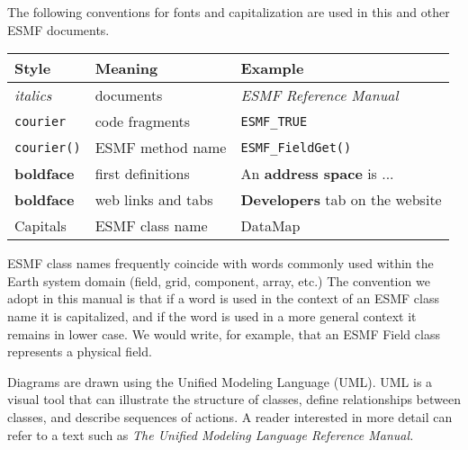 
The following conventions for fonts and capitalization are used
in this and other ESMF documents. \newline

\begin{tabular}{lll}
{\bf Style} & {\bf Meaning} & {\bf Example} \\ \hline
{\it italics}  & documents & {\it ESMF Reference Manual}\\
{\tt courier}  & code fragments & {\tt ESMF\_TRUE}\\
{\tt courier()}  & ESMF method name & {\tt ESMF\_FieldGet()} \\
{\bf boldface} & first definitions & An {\bf address space} is ...\\
{\bf boldface} & web links and tabs & {\bf Developers} tab on the website \\
{Capitals}     & ESMF class name & DataMap \\
\end{tabular} 
 
ESMF class names frequently coincide with words commonly
used within the Earth system domain (field, grid, component, array, 
etc.)  The convention we adopt in this manual is that if a word is 
used in the context of an ESMF class name it is capitalized, and 
if the word is used in a more general context it remains in lower 
case.  We would write, for example, that an ESMF Field class 
represents a physical field.  


Diagrams are drawn using the Unified Modeling Language (UML).  UML 
is a visual tool that can illustrate the structure of 
classes, define relationships between classes, and describe sequences
of actions.  A reader interested in more detail can refer to a 
text such as {\it The Unified Modeling Language Reference Manual.}
 \cite{uml}

